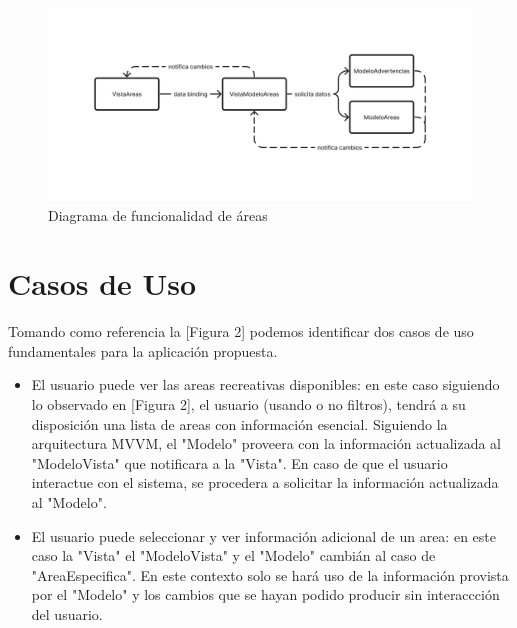 \documentclass{scrartcl}
\begin{document}
        \begin{figure}
            \centerline{\includegraphics[scale=0.4]{areasdiagram}}
            \caption{Diagrama de funcionalidad de áreas}
            \label{fig:areasdiagram}
         \end{figure}
    
    \newpage
    \section{Casos de Uso}
        Tomando como referencia la [Figura 2] podemos identificar dos casos de uso
        fundamentales para la aplicación propuesta.

        \begin{itemize}
            \item El usuario puede ver las areas recreativas disponibles: en este caso
                    siguiendo lo observado en [Figura 2], el usuario (usando o no filtros),
                    tendrá a su disposición una lista de areas con información esencial. 
                    Siguiendo la arquitectura MVVM, el "Modelo" proveera con la información
                    actualizada al "ModeloVista" que notificara a la "Vista". En caso de que
                    el usuario interactue con el sistema, se procedera a solicitar la información
                    actualizada al "Modelo".
            \item El usuario puede seleccionar y ver información adicional de un area: en este
                   caso la "Vista" el "ModeloVista" y el "Modelo" cambián al caso de "AreaEspecifica".
                   En este contexto solo se hará uso de la información provista por el "Modelo" y los
                   cambios que se hayan podido producir sin interaccción del usuario.
        \end{itemize}

    
\end{document}
